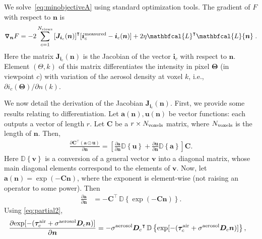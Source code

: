 \documentclass[10pt,letterpaper]{article}
\newcommand{\OpDistance}{\bm{D}}
\newcommand{\Laplacian}{\mathbfcal{L}}
\newcommand{\OpDiag}[1]{\mathbb{D}\left\{#1\right\}}
\newcommand{\Grad}[1]{\bm{\triangledown_{#1}}}
\newcommand{\PartDeriv}[2]{\frac{\partial{#1}}{\partial{#2}}}
\newcommand{\vect}[1]{\bm{#1}}
\newcommand{\mat}[1]{\bm{#1}}
\newcommand{\transpose}[1]{{#1}^\intercal}
\begin{document}
We solve~\cref{eq:minobjectiveA} using standard optimization tools.
The gradient of $F$ with respect to ${\bm n}$ is
\begin{align}
  \Grad{{\bm n}} F = -2\sum_{c=1}^{N_{\rm views}}
  \transpose{\left[{\bm J}_{{\bm i}_c}({\bm n})\right]} [{\bm i}^{\rm
    measured}_c - {\bm i}_c({\bm n})] + 2 \eta
  \transpose{\Laplacian}\Laplacian{\bm n} \;.
  \label{eq:gradient1}
\end{align}
Here the matrix ${\bm J}_{{\bm i}_c}({\bm n})$ is the Jacobian of the
vector ${\bm i}_c$ with respect to ${\bm n}$.  Element $(\Theta,k)$ of
this matrix differentiates the intensity in pixel ${\bm \Theta}$ (in
viewpoint $c$) with variation of the aerosol density at voxel $k$,
i.e., $\partial i_c({\bm \Theta})/\partial{n(k)}$.

We now detail the derivation of the Jacobian ${\bm J}_{{\bm i}_c}({\bm
  n})$. First, we provide some results relating to differentiation.
Let $\vect{a}(\vect{n}),\vect{u}(\vect{n})$ be vector functions: each
outputs a vector of length $r$. Let $\mat{C}$ be a $r \times N_{\rm
  voxels}$ matrix, where $N_{\rm voxels}$ is the length of ${\bm n}$.
Then,
\begin{align}
  \label{eq:partial1}
  \PartDeriv{\transpose{\mat{C}} (\vect{a} \odot \vect{u})}{\vect{n}}
  = \left[ \PartDeriv{\vect{a}}{\vect{n}} \OpDiag{\vect{u}} +
    \PartDeriv{\vect{u}}{\vect{n}} \OpDiag{\vect{a}} \right] \mat{C}.
\end{align}
Here $\OpDiag{\vect{v}}$ is a conversion of a general vector
$\vect{v}$ into a diagonal matrix, whose main diagonal elements
correspond to the elements of $\vect{v}$. Now, let
$\vect{a}(\vect{n}) = \exp(-{\mat{C}}\vect{n})$,
where the exponent is element-wise (not raising an operator to some
power). Then
\begin{align}
  \label{eq:partial2}
  \PartDeriv{\vect{a}}{\vect{n}} &= - \transpose{\mat{C}} \,
  \OpDiag{\exp(-{\mat{C}}\vect{n})}.
\end{align}
Using \cref{eq:partial2},
\begin{align}
  \label{eq:partial4}
  \PartDeriv{\exp[-(\vect{\tau}_c^{\rm air} + {\sigma}^{\rm
      aerosol}{\bm D}_c {\bm n})]}
  {\vect{n}} &= - {\sigma}^{\rm aerosol}\transpose{\OpDistance_c} \,
  \OpDiag{\exp[-(\vect{\tau}_c^{\rm air} + {\sigma}^{\rm aerosol}{\bm
      D}_c {\bm n})]},
\end{align}
\end{document}
